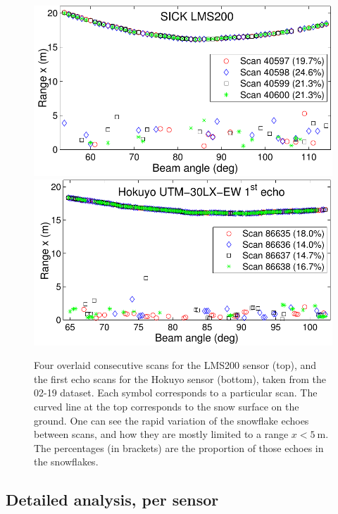 \begin{figure}[th]
\centering
\includegraphics[trim={0.2cm 0 0 0},clip,width=0.9\linewidth]{./img/LMS200_4Scans_Feb19.pdf}
    \includegraphics[trim={0.2cm 0 0 0},clip,width=0.9\linewidth]{./img/Hokuyo_4Scans_Feb19.pdf}
    \caption{Four overlaid consecutive scans for the LMS200 sensor (top), and the first echo scans for the Hokuyo sensor (bottom), taken from the 02-19 dataset. Each symbol corresponds to a particular scan. The curved line at the top corresponds to the snow surface on the ground. One can see the rapid variation of the snowflake echoes between scans, and how they are mostly limited to a range $x<\SI{5}{\meter}$. The percentages (in brackets) are the proportion of those echoes in the snowflakes.}
    \label{fig:LMS200_4Scans_Feb19}
\end{figure}

\subsection{Detailed analysis, per sensor}

